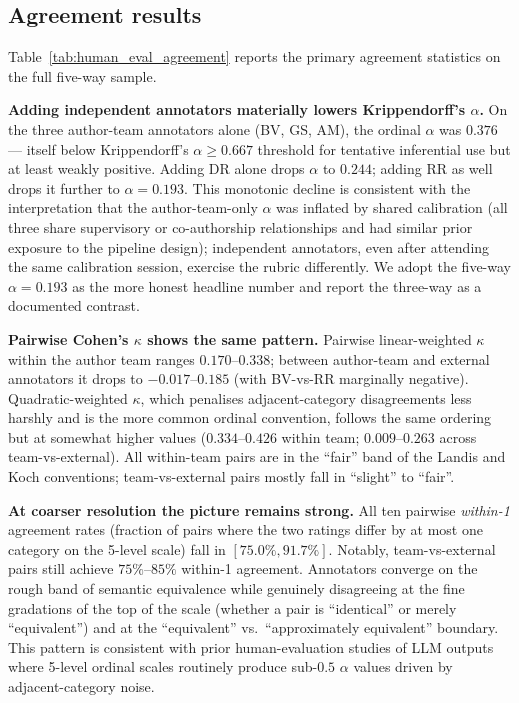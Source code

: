 \subsection{Agreement results}
\label{sec:human_eval_agreement_results}



Table~\ref{tab:human_eval_agreement} reports the primary agreement
statistics on the full five-way sample.

\textbf{Adding independent annotators materially lowers Krippendorff's
$\alpha$.} On the three author-team annotators alone (BV, GS, AM), the
ordinal $\alpha$ was $0.376$ --- itself below Krippendorff's
$\alpha \geq 0.667$ threshold for tentative inferential use but at least
weakly positive. Adding DR alone drops $\alpha$ to $0.244$; adding RR as
well drops it further to $\alpha = 0.193$. This monotonic decline is
consistent with the interpretation that the author-team-only $\alpha$
was inflated by shared calibration (all three share supervisory or
co-authorship relationships and had similar prior exposure to the
pipeline design); independent annotators, even after attending the same
calibration session, exercise the rubric differently. We adopt the
five-way $\alpha = 0.193$ as the more honest headline number and report
the three-way as a documented contrast.

\textbf{Pairwise Cohen's $\kappa$ shows the same pattern.} Pairwise
linear-weighted $\kappa$ within the author team ranges $0.170$--$0.338$;
between author-team and external annotators it drops to $-0.017$--$0.185$
(with BV-vs-RR marginally negative). Quadratic-weighted $\kappa$, which
penalises adjacent-category disagreements less harshly and is the more
common ordinal convention, follows the same ordering but at somewhat
higher values ($0.334$--$0.426$ within team; $0.009$--$0.263$
across team-vs-external). All within-team pairs are in the ``fair'' band
of the Landis and Koch conventions; team-vs-external pairs mostly fall
in ``slight'' to ``fair''.

\textbf{At coarser resolution the picture remains strong.} All ten
pairwise \emph{within-1} agreement rates (fraction of pairs where the
two ratings differ by at most one category on the 5-level scale) fall
in $[75.0\%, 91.7\%]$. Notably, team-vs-external pairs still achieve
$75\%$--$85\%$ within-1 agreement. Annotators converge on the rough
band of semantic equivalence while genuinely disagreeing at the fine
gradations of the top of the scale (whether a pair is ``identical'' or
merely ``equivalent'') and at the ``equivalent'' vs.\ ``approximately
equivalent'' boundary. This pattern is consistent with prior
human-evaluation studies of LLM outputs where 5-level ordinal scales
routinely produce sub-$0.5$ $\alpha$ values driven by
adjacent-category noise.

